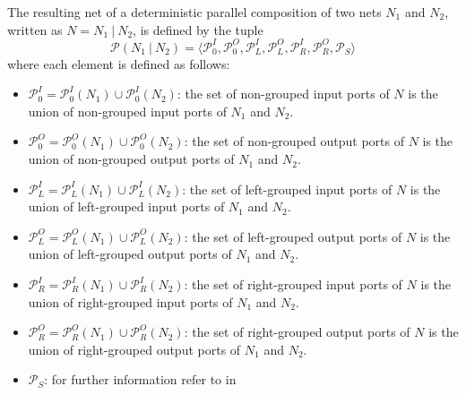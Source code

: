\begin{definition}
    \label{def_smx_pd}
    The resulting net of a deterministic parallel composition of two nets $N_1$ and $N_2$, written as $N = N_1\ |\ N_2$, is defined by the tuple
    $$\mathcal{P}(N_1\ |\ N_2) = \langle \mathcal{P}_0^I, \mathcal{P}_0^O, \mathcal{P}_L^I, \mathcal{P}_L^O, \mathcal{P}_R^I, \mathcal{P}_R^O, \mathcal{P}_S \rangle$$
    where each element is defined as follows:
    \begin{itemize}
        \item $\mathcal{P}_0^I = \mathcal{P}_0^I(N_1) \cup \mathcal{P}_0^I(N_2)$:
            the set of non-grouped input ports of $N$ is the union of non-grouped input ports of $N_1$ and $N_2$.
        \item $\mathcal{P}_0^O = \mathcal{P}_0^O(N_1) \cup \mathcal{P}_0^O(N_2)$:
            the set of non-grouped output ports of $N$ is the union of non-grouped output ports of $N_1$ and $N_2$.
        \item $\mathcal{P}_L^I = \mathcal{P}_L^I(N_1) \cup \mathcal{P}_L^I(N_2)$:
            the set of left-grouped input ports of $N$ is the union of left-grouped input ports of $N_1$ and $N_2$.
        \item $\mathcal{P}_L^O = \mathcal{P}_L^O(N_1) \cup \mathcal{P}_L^O(N_2)$:
            the set of left-grouped output ports of $N$ is the union of left-grouped output ports of $N_1$ and $N_2$.
        \item $\mathcal{P}_R^I = \mathcal{P}_R^I(N_1) \cup \mathcal{P}_R^I(N_2)$:
            the set of right-grouped input ports of $N$ is the union of right-grouped input ports of $N_1$ and $N_2$.
        \item $\mathcal{P}_R^O = \mathcal{P}_R^O(N_1) \cup \mathcal{P}_R^O(N_2)$:
            the set of right-grouped output ports of $N$ is the union of right-grouped output ports of $N_1$ and $N_2$.
        \item $\mathcal{P}_S$:
            for further information refer to \Def{\ref{def_smx_side}} in \Sect{\ref{sect_smx_nets_side}}
    \end{itemize}

\end{definition}

